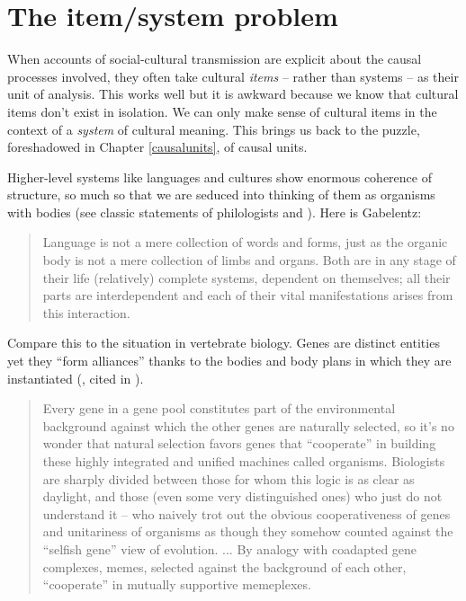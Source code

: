 
\chapter{The item/system problem}
\label{itemsystemproblem}


When accounts of social-cultural transmission are explicit about the 
causal processes involved, they often take cultural \textit{items} -- rather than systems -- as their unit of analysis. This works well 
but it is awkward because we know that cultural items don't exist in 
isolation. We can only make sense of cultural items in the context of a 
\textit{system} of cultural meaning. This brings us back to the puzzle, foreshadowed in Chapter \ref{causalunits}, of causal units. 



Higher-level systems like languages and cultures show enormous coherence 
of structure, so much so that we are seduced into thinking of them as organisms with 
bodies (see classic statements of philologists \citealt{gabelentz_sprachwissenschaft_1891} and \citealt[16]{meillet_linguistique_1926}). Here is Gabelentz:

\begin{quotation}
Language is not a mere collection of words and forms, just as the organic body is not a mere collection of limbs and organs. Both are in any stage of their life (relatively) complete systems, dependent on themselves; all their parts are interdependent and each of their vital manifestations arises from this interaction. \citep[10]{gabelentz_sprachwissenschaft_1891}
\end{quotation}

Compare this to the situation in vertebrate 
biology. Genes are distinct entities yet they ``form 
alliances'' thanks to the bodies and body plans in which they are 
instantiated (\citealt{gould_ontogeny_1977}, cited in \citealt[117]{dawkins_extended_1982}). 

\begin{quotation}
Every gene in a gene pool constitutes part of the environmental background against which the other genes are naturally selected, so it's no wonder that natural selection favors genes that ``cooperate'' in building these highly integrated and unified machines called organisms.  Biologists are sharply divided between those for whom this logic is as clear as daylight, and those (even some very distinguished ones) who just do not understand it -- who naively trot out the obvious cooperativeness of genes and unitariness of organisms as though they somehow counted against the ``selfish gene'' view of evolution. ... By analogy with coadapted gene complexes, memes, selected against the background of each other, ``cooperate'' in mutually supportive memeplexes. \citep[xv]{DawkinsMemeForeword1999}
\end{quotation}

